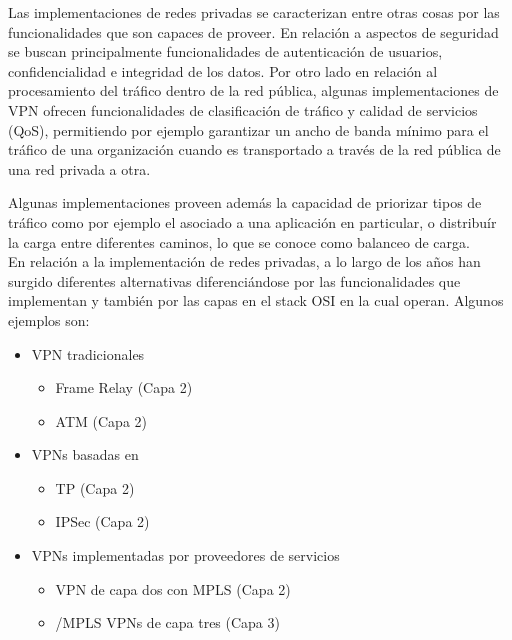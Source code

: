 
Las implementaciones de redes privadas se caracterizan entre otras cosas por las funcionalidades que son capaces de proveer. En relaci\'on a aspectos de seguridad se buscan principalmente funcionalidades de autenticaci\'on de usuarios, confidencialidad e integridad de los datos. Por otro lado en relaci\'on al procesamiento del tr\'afico dentro de la red p\'ublica, algunas implementaciones de VPN ofrecen funcionalidades de clasificaci\'on de tr\'afico y calidad de servicios (QoS), permitiendo por ejemplo garantizar un ancho de banda m\'inimo para el tr\'afico de una organizaci\'on cuando es transportado a trav\'es de la red p\'ublica de una red privada a otra. 

Algunas implementaciones proveen adem\'as la capacidad de priorizar tipos de tr\'afico como por ejemplo el asociado a una aplicaci\'on en particular, o distribu\'ir la carga entre diferentes caminos, lo que se conoce como balanceo de carga.\\


En relaci\'on a la implementaci\'on de redes privadas, a lo largo de los años han surgido diferentes alternativas diferenciándose por las funcionalidades que implementan y tambi\'en por las capas en el stack OSI en la cual operan. Algunos ejemplos son: 

\begin{itemize}
\item VPN tradicionales
	\begin{itemize}
	\item Frame Relay (Capa 2)	
	\item ATM (Capa 2)
	\end{itemize}
	
\item VPNs basadas en 
	\begin{itemize}
	\item {}TP (Capa 2)
	\item IPSec (Capa 2)
	\end{itemize}
	
\item VPNs implementadas por proveedores de servicios
	\begin{itemize}
	\item VPN de capa dos con MPLS (Capa 2)
	\item {}/MPLS VPNs de capa tres (Capa 3)
	\end{itemize}
\end{itemize}

